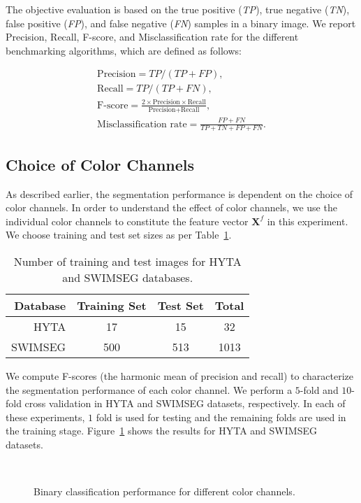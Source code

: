 The objective evaluation is based on the true positive (\emph{TP}), true negative (\emph{TN}), false positive (\emph{FP}), and false negative (\emph{FN}) samples in a binary image. We report Precision, Recall, F-score, and Misclassification rate for the different benchmarking algorithms, which are defined as follows: 

\begin{gather*}
\mbox{Precision}=TP/(TP+FP),\\
\mbox{Recall}=TP/(TP+FN),\\
\mbox{F-score}=\frac{2\times\mbox{Precision}\times\mbox{Recall}}{{\mbox{Precision}+\mbox{Recall}}},\\
\mbox{Misclassification rate}=\frac{FP+FN}{TP+TN+FP+FN}.
\end{gather*}


\subsection{Choice of Color Channels}
As described earlier, the segmentation performance is dependent on the choice of color channels. In order to understand the effect of color channels, we use the individual color channels to constitute the feature vector $\mathbf{X}^{f}$ in this experiment. We choose training and test set sizes as per Table~\ref{table:train-test}. 

\begin{table}[htbp]
\normalsize
\centering
\begin{tabular}{r||c|c|c}
  \hline
  \textbf{Database}  & \textbf{Training Set} & \textbf{Test Set} & \textbf{Total}  \\
  \hline
  HYTA & 17 & 15 & 32 \\
  SWIMSEG & 500 & 513 & 1013 \\
  \hline
\end{tabular}
\caption{Number of training and test images for HYTA and SWIMSEG databases.}
\label{table:train-test}
\end{table}

We compute F-scores (the harmonic mean of precision and recall) to characterize the segmentation performance of each color channel. We perform a $5$-fold and $10$-fold cross validation in HYTA and SWIMSEG datasets, respectively. In each of these experiments, $1$ fold is used for testing and the remaining folds are used in the training stage. Figure~\ref{fig:CV-result} shows the results for HYTA and SWIMSEG datasets. 

\begin{figure}[H]
\centering
{}\vspace{-0.4cm}\\
\caption{Binary classification performance for different color channels.}\label{fig:CV-result}
\end{figure}


